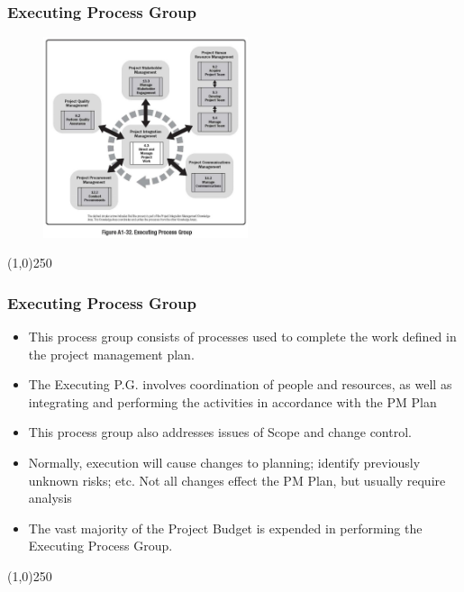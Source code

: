 \begin{frame}
\frametitle{Executing Process Group}
 \begin{figure}
 	\centering
 		\includegraphics[width = 6cm]{images/FigA1-32.jpg}
 	\label{fig:A1-32}
 \end{figure}
\end{frame}
\begin{center}\line(1,0){250}\end{center}



\begin{frame}
\frametitle{Executing Process Group}
\begin{itemize}
	\item This process group consists of processes used to complete the work defined in the project management plan.
	\item The Executing P.G. involves coordination of people and resources, as well as integrating and performing the activities in accordance with the PM Plan
	\item This process group also addresses issues of Scope and change control.
	\item Normally, execution will cause changes to planning; identify previously unknown risks; etc.  Not all changes effect the PM Plan, but usually require analysis
	\item The vast majority of the Project Budget is expended in performing the Executing Process Group. 
\end{itemize}
\end{frame}
\begin{center}\line(1,0){250}\end{center}




